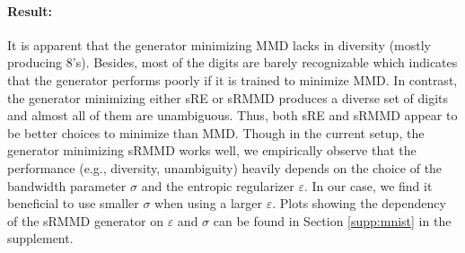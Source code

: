 \documentclass{article}
\theoremstyle{definition}
\begin{document}
\paragraph{Result:} 
It is apparent that the generator minimizing MMD lacks in diversity (mostly producing 8's). Besides, most of the digits are barely recognizable which indicates that the generator performs poorly if it is trained to minimize MMD. In contrast, the generator minimizing either sRE or sRMMD produces a diverse set of digits and almost all of them are unambiguous. Thus, both sRE and sRMMD appear to be better choices to minimize than MMD. Though in the current setup, the generator minimizing sRMMD works well, we empirically observe that the performance (e.g., diversity, unambiguity) heavily depends on the choice of the bandwidth parameter $\sigma$ and the entropic regularizer $\varepsilon$. In our case, we find it beneficial to use smaller $\sigma$ when using a larger $\varepsilon$. Plots showing the dependency of the sRMMD generator on $\varepsilon$ and $\sigma$ can be found in Section \ref{supp:mnist} in the supplement.
\end{document}
